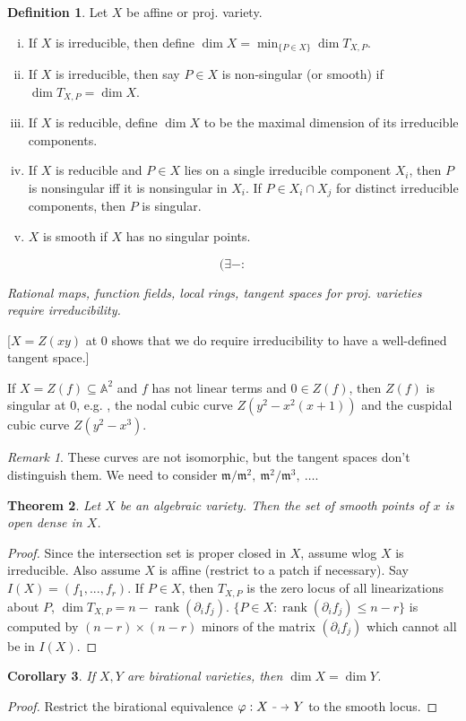 \documentclass{article}
\theoremstyle{definition}
\newtheorem{defn}{Definition}[section]
\theoremstyle{remark}
\newtheorem{rem}{Remark}
\theoremstyle{plain}
\newtheorem{thm}[defn]{Theorem}
\newtheorem{crly}[defn]{Corollary}
\newcommand{\bA}{\mathbb{A}}
\newcommand\dashto{\mathrel{
  -\mkern-6mu{\to}\mkern-20mu{\color{white}\bullet}\mkern12mu
}}
\begin{document}
\begin{defn}
    Let $X$ be affine or proj. variety. \begin{enumerate}[(i)]
        \item If $X$ is irreducible, then define $\dim X=\min_{\{P\in X\}}\dim T_{X,P}$.
        \item If $X$ is irreducible, then say $P\in X$ is non-singular (or smooth) if $\dim T_{X,P}=\dim X$.
        \item If $X$ is reducible, define $\dim X$ to be the maximal dimension of its irreducible components.
        \item If $X$ is reducible and $P\in X$ lies on a single irreducible component $X_i$, then $P$ is nonsingular iff it is nonsingular in $X_i$. If $P\in X_i\cap X_j$ for distinct irreducible components, then $P$ is singular.
        \item $X$ is smooth if $X$ has no singular points.
    \end{enumerate}
\end{defn}
\[(\exists-:\tag{Owen's Signature}\]

\textit{Rational maps, function fields, local rings, tangent spaces for proj. varieties require irreducibility.}

[$X=Z(xy)$ at $0$ shows that we do require irreducibility to have a well-defined tangent space.]

If $X=Z(f)\subseteq\bA^2$ and $f$ has not linear terms and $0\in Z(f)$, then $Z(f)$ is singular at $0$, e.g. , the nodal cubic curve $Z(y^2-x^2(x+1))$ and the cuspidal cubic curve $Z(y^2-x^3)$.
\begin{rem}
    These curves are not isomorphic, but the tangent spaces don't distinguish them. We need to consider $\mathfrak m/\mathfrak m^2,\ \mathfrak m^2/\mathfrak m^3,\ \ldots$.
\end{rem}
\begin{thm}
    Let $X$ be an algebraic variety. Then the set of smooth points of $x$ is open dense in $X$.
\end{thm}
\begin{proof}
    Since the intersection set is proper closed in $X$, assume wlog $X$ is irreducible. Also assume $X$ is affine (restrict to a patch if necessary). Say $I(X)=(f_1,...,f_r)$. If $P\in X$, then $T_{X,P}$ is the zero locus of all linearizations about $P$, $\dim T_{X,P}=n-\operatorname{rank}(\partial_if_j)$. $\{P\in X:\operatorname{rank}(\partial_if_j)\le n-r\}$  is computed by $(n-r)\times(n-r)$ minors of the matrix $(\partial_if_j)$ which cannot all be in $I(X)$.
\end{proof}
\begin{crly}
    If $X,Y$ are birational varieties, then $\dim X=\dim Y$.
\end{crly}
\begin{proof}
    Restrict the birational equivalence $\varphi:X\dashto Y$ to the smooth locus.
\end{proof}
\end{document}
